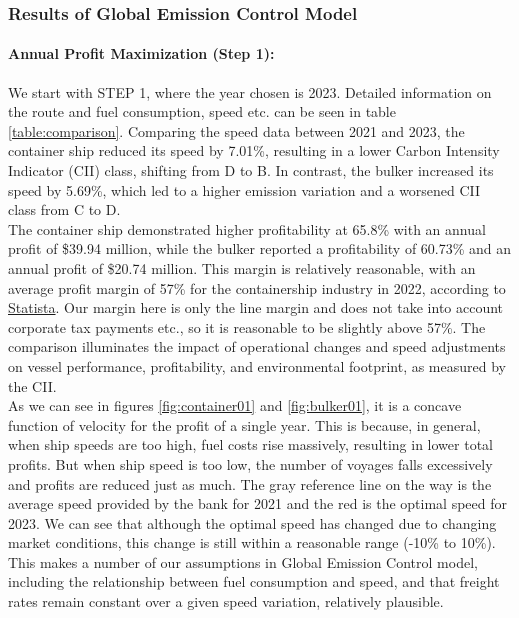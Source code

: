 \documentclass[a4paper,12pt]{article}
\begin{document}
\subsubsection{Results of Global Emission Control Model}
\paragraph{Annual Profit Maximization (Step 1):}
We start with STEP 1, where the year chosen is 2023. Detailed information on the route and fuel consumption, speed etc. can be seen in table \ref{table:comparison}.
Comparing the speed data between 2021 and 2023, the container ship reduced its speed by 7.01\%, resulting in a lower Carbon Intensity Indicator (CII) class, shifting from D to B.
In contrast, the bulker increased its speed by 5.69\%, which led to a higher emission variation and a worsened CII class from C to D.\\

The container ship demonstrated higher profitability at 65.8\% with an annual profit of \$39.94 million, while the bulker reported a profitability of 60.73\% and an annual profit of \$20.74 million.
This margin is relatively reasonable, with an average profit margin of 57\% for the containership industry in 2022, according to \href{https://www.statista.com/statistics/1263780/ebit-margins-of-container-carriers-by-quarter}{Statista}.
Our margin here is only the line margin and does not take into account corporate tax payments etc., so it is reasonable to be slightly above 57\%.
The comparison illuminates the impact of operational changes and speed adjustments on vessel performance, profitability, and environmental footprint, as measured by the CII.\\

As we can see in figures \ref{fig:container01} and \ref{fig:bulker01}, it is a concave function of velocity for the profit of a single year.
This is because, in general, when ship speeds are too high, fuel costs rise massively, resulting in lower total profits.
But when ship speed is too low, the number of voyages falls excessively and profits are reduced just as much.
The gray reference line on the way is the average speed provided by the bank for 2021 and the red is the optimal speed for 2023.
We can see that although the optimal speed has changed due to changing market conditions, this change is still within a reasonable range (-10\% to 10\%).
This makes a number of our assumptions in Global Emission Control model, including the relationship between fuel consumption and speed, and that freight rates remain constant over a given speed variation, relatively plausible.
\end{document}
